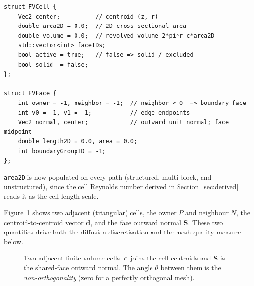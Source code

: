 \documentclass[11pt]{article}
\begin{document}
\begin{lstlisting}
struct FVCell {
    Vec2 center;          // centroid (z, r)
    double area2D = 0.0;  // 2D cross-sectional area
    double volume = 0.0;  // revolved volume 2*pi*r_c*area2D
    std::vector<int> faceIDs;
    bool active = true;   // false => solid / excluded
    bool solid  = false;
};

struct FVFace {
    int owner = -1, neighbor = -1;  // neighbor < 0  => boundary face
    int v0 = -1, v1 = -1;           // edge endpoints
    Vec2 normal, center;            // outward unit normal; face midpoint
    double length2D = 0.0, area = 0.0;
    int boundaryGroupID = -1;
};
\end{lstlisting}

\noindent \texttt{area2D} is now populated on every path (structured, multi-block, and
unstructured), since the cell Reynolds number derived in Section~\ref{sec:derived} reads
it as the cell length scale.

Figure~\ref{fig:fvcell} shows two adjacent (triangular) cells, the owner $P$ and
neighbour $N$, the centroid-to-centroid vector $\mathbf{d}$, and the face outward
normal $\mathbf{S}$. These two quantities drive both the diffusion discretisation and
the mesh-quality measure below.

\begin{figure}[h]
\centering
{}
\caption{Two adjacent finite-volume cells. $\mathbf{d}$ joins the cell centroids and
$\mathbf{S}$ is the shared-face outward normal. The angle $\theta$ between them is the
\emph{non-orthogonality} (zero for a perfectly orthogonal mesh).}
\label{fig:fvcell}
\end{figure}
\end{document}
